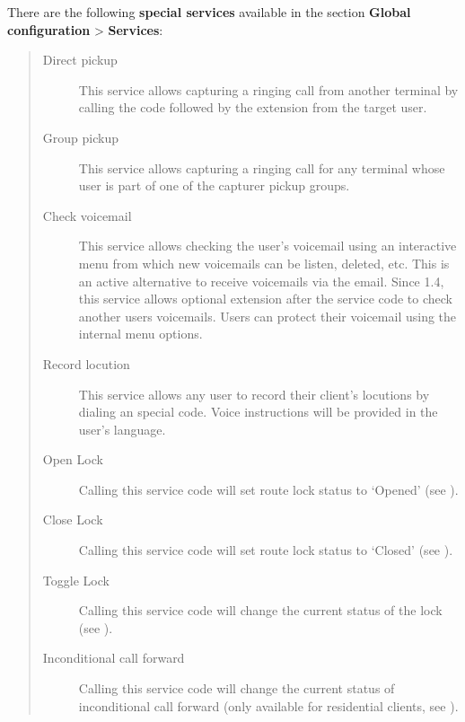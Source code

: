 \documentclass[letterpaper,10pt,spanish]{sphinxmanual}
\begin{document}
There are the following \textbf{special services} available in the section \textbf{Global
configuration} \textgreater{} \textbf{Services}:
\begin{quote}
\begin{description}
\item[{Direct pickup}] \leavevmode
This service allows capturing a ringing call from another terminal by
calling the code followed by the extension from the target user.

\item[{Group pickup}] \leavevmode
This service allows capturing a ringing call for any terminal whose user
is part of one of the capturer pickup groups.

\item[{Check voicemail}] \leavevmode
This service allows checking the user's voicemail using an interactive
menu from which new voicemails can be listen, deleted, etc. This is an
active alternative to receive voicemails via the email. Since 1.4, this
service allows optional extension after the service code to check
another users voicemails. Users can protect their voicemail using the
internal menu options.

\item[{Record locution}] \leavevmode
This service allows any user to record their client's locutions by
dialing an special code. Voice instructions will be provided in the
user's language.

\item[{Open Lock}] \leavevmode
Calling this service code will set route lock status to `Opened' (see {\hyperref[administration_portal/client/vpbx/routing_tools/route_locks:route\string-locks]{}}).

\item[{Close Lock}] \leavevmode
Calling this service code will set route lock status to `Closed' (see {\hyperref[administration_portal/client/vpbx/routing_tools/route_locks:route\string-locks]{}}).

\item[{Toggle Lock}] \leavevmode
Calling this service code will change the current status of the lock (see {\hyperref[administration_portal/client/vpbx/routing_tools/route_locks:route\string-locks]{}}).

\item[{Inconditional call forward}] \leavevmode
Calling this service code will change the current status of inconditional call forward (only available for
residential clients, see {\hyperref[administration_portal/client/residential/residential_devices:residential\string-devices\string-cfw]{}}).


\end{description}
\end{quote}
\end{document}
